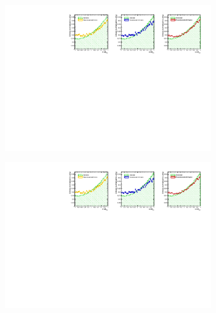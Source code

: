 \begin{figure}
	\centering
	\begin{subfigure}{0.33\textwidth}
		\includegraphics[clip, trim=0.1cm 0cm 13.9cm 0cm,width=0.99\textwidth]{ILD/plots/one-charge.pdf}
		\caption{\label{fig:OneCharge_a_3} }
	\end{subfigure}%
	\begin{subfigure}{0.33\textwidth}
		\centering
		\includegraphics[clip, trim=6.78cm 0cm 7.3cm 0cm,width=0.99\textwidth]{ILD/plots/one-charge.pdf}
		\caption{\label{fig:OneCharge_b_3} }
	\end{subfigure}
	\begin{subfigure}{0.33\textwidth}
		\centering

\end{subfigure}
\end{figure}
